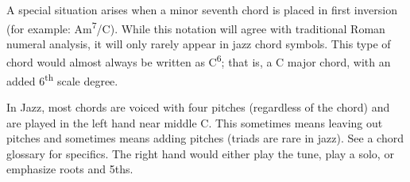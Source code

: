\documentclass{article}
\begin{document}
A special situation arises when a minor seventh chord is placed in first inversion (for example: Am\textsuperscript{7}/C). While this notation will agree with traditional Roman numeral analysis, it will only rarely appear in jazz chord symbols. This type of chord would almost always be written as C\textsuperscript{6}; that is, a C major chord, with an added 6\textsuperscript{th} scale degree.

In Jazz, most chords are voiced with four pitches (regardless of the chord) and are played in the left hand near middle C. This sometimes means leaving out pitches and sometimes means adding pitches (triads are rare in jazz). See a chord glossary for specifics. The right hand would either play the tune, play a solo, or emphasize roots and 5ths.
\end{document}
